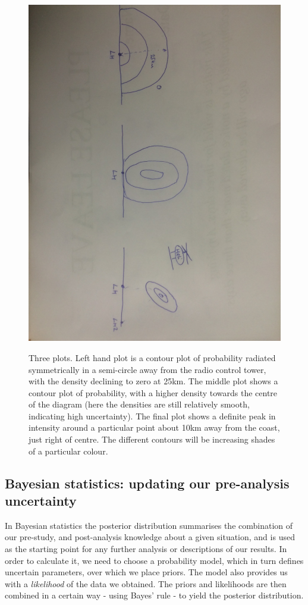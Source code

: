 \documentclass[11pt,fullpage]{book}
\begin{document}
\begin{figure}
\centering
\scalebox{0.2} 
{\includegraphics{Posterior_bayesianLighthouse.jpg}}
\caption{Three plots. Left hand plot is a contour plot of probability radiated symmetrically in a semi-circle away from the radio control tower, with the density declining to zero at 25km. The middle plot shows a contour plot of probability, with a higher density towards the centre of the diagram (here the densities are still relatively smooth, indicating high uncertainty). The final plot shows a definite peak in intensity around a particular point about 10km away from the coast, just right of centre. The different contours will be increasing shades of a particular colour.}\label{fig:Posterior_bayesianLighthouse}
\end{figure}

\subsection{Bayesian statistics: updating our pre-analysis uncertainty}
In Bayesian statistics the posterior distribution summarises the combination of our pre-study, and post-analysis knowledge about a given situation, and is used as the starting point for any further analysis or descriptions of our results. In order to calculate it, we need to choose a probability model, which in turn defines uncertain parameters, over which we place priors. The model also provides us with a \textit{likelihood} of the data we obtained. The priors and likelihoods are then combined in a certain way - using Bayes' rule - to yield the posterior distribution.
\end{document}
